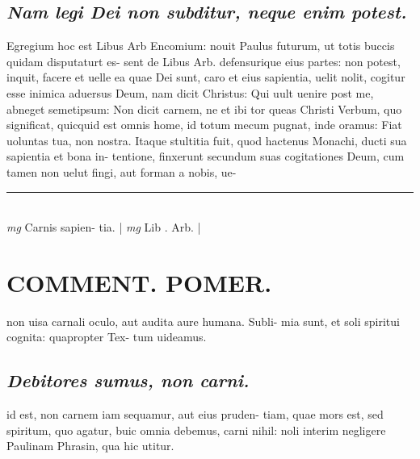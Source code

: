 \documentclass{article}
\begin{document}
\begin{pages}
\subsection*{\textit{Nam legi Dei non subditur, neque  enim potest. }}\pstart Egregium hoc est Libus Arb Encomium: nouit Paulus futurum, ut totis buccis quidam disputaturt es- sent de Libus Arb. defensurique eius partes: non potest, inquit, facere et uelle ea quae Dei sunt, caro et eius sapientia, uelit nolit, cogitur esse inimica aduersus Deum, nam dicit Christus: Qui uult uenire post me, abneget semetipsum: Non dicit carnem, ne et ibi tor queas Christi Verbum, quo significat, quicquid est omnis home, id totum mecum pugnat, inde oramus: Fiat uoluntas tua, non nostra. Itaque stultitia fuit, quod hactenus Monachi, ducti sua sapientia et bona in- tentione, finxerunt secundum suas cogitationes Deum, cum tamen non uelut fingi, aut forman a nobis, ue-  \pend
\vspace{0.5cm}\noindent
\vspace{0.2cm}\rule{1cm}{0.2pt}\\ 
\hspace{0.2cm}\textit{mg}
\footnotesize Carnis sapien- tia.  
\normalsize| 
\hspace{0.2cm}\textit{mg}
\footnotesize Lib . Arb.  
\normalsize| 
\section*{COMMENT. POMER.  }\pstart non uisa carnali oculo, aut audita aure humana. Subli- mia sunt, et soli spiritui cognita: quapropter Tex- tum uideamus.   \pend
{}
{}
\subsection*{\textit{Debitores sumus, non carni. }}\pstart id est, non carnem iam sequamur, aut eius pruden- tiam, quae mors est, sed spiritum, quo agatur, buic omnia debemus, carni nihil: noli interim negligere Paulinam Phrasin, qua hic utitur.   \pend
{}
{}

\end{pages}
\end{document}
